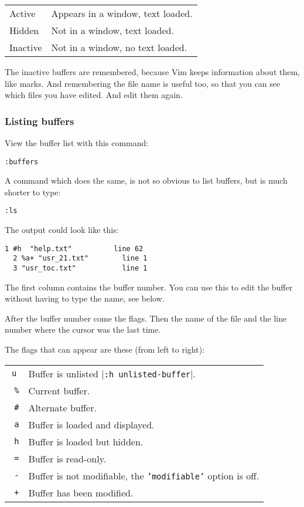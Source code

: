 \begin{center} \begin{tabular}{l l}
				Active & Appears in a window, text loaded. \\
				Hidden & Not in a window, text loaded. \\
				Inactive & Not in a window, no text loaded. \\
\end{tabular} \end{center}

The inactive buffers are remembered, because Vim keeps information about them, like marks.
And remembering the file name is useful too, so that you can see which files you have edited.
And edit them again.

\subsubsection{Listing buffers}
View the buffer list with this command:

\begin{Verbatim}[samepage=true]
 :buffers
\end{Verbatim}

A command which does the same, is not so obvious to list buffers, but is much shorter to type:

\begin{Verbatim}[samepage=true]
 :ls
\end{Verbatim}

The output could look like this:

\begin{Verbatim}[samepage=true]
  1 #h  "help.txt"          line 62
  2 %a+ "usr_21.txt"        line 1
  3 "usr_toc.txt"           line 1
\end{Verbatim}

The first column contains the buffer number.
You can use this to edit the buffer without having to type the name, see below.

After the buffer number come the flags.
Then the name of the file and the line number where the cursor was the last time.

The flags that can appear are these (from left to right):
\begin{center} \begin{tabular}{c l}
				\texttt{u} &  Buffer is unlisted |\texttt{:h unlisted-buffer}|. \\
				\texttt{  \%} &  Current buffer. \\
				\texttt{  \#} &  Alternate buffer. \\
				\texttt{    a} & Buffer is loaded and displayed. \\
				\texttt{    h} & Buffer is loaded but hidden. \\
				\texttt{      =} & Buffer is read-only. \\
				\texttt{      -} & Buffer is not modifiable, the \texttt{'modifiable'} option is off. \\
				\texttt{        +} & Buffer has been modified. \\
\end{tabular} \end{center}

